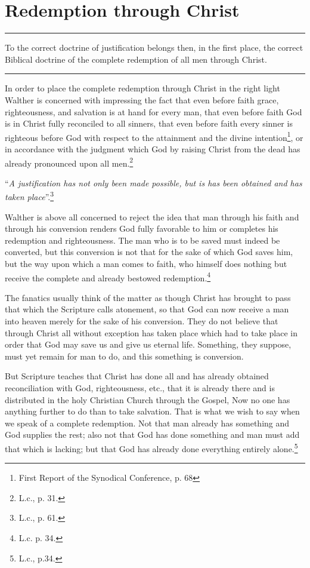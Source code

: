                 \section{Redemption through Christ}
                \hrule
\vspace{.30cm}
To the correct doctrine of justification belongs then, in the first place, the correct Biblical doctrine of the complete redemption of all men through Christ.
\vspace{.01cm}
\hrule
\vspace{1.25cm}
                In order to place the complete redemption through Christ in the right light Walther is concerned with impressing the fact that even before faith grace, righteousness, and salvation is at hand for every man, that even before faith God is in Christ fully reconciled to all sinners, that even before faith every sinner is righteous before God with respect to the attainment and the divine intention\footnote{First Report of the Synodical Conference, p. 68}, or in accordance with the judgment which God by raising Christ from the dead has already pronounced upon all men.\footnote{L.c., p. 31.}  \begin{displayquote}“\textit{A justification has not only been made possible, but is has been obtained and has taken place}”.\footnote{L.c., p. 61.}\end{displayquote}  Walther is above all concerned to reject the idea that man through his faith and through his conversion renders God fully favorable to him or completes his redemption and righteousness.  The man who is to be saved must indeed be converted, but this conversion is not that for the sake of which God saves him, but the way upon which a man comes to faith, who himself does nothing but receive the complete and already bestowed redemption.\footnote{L.c. p. 34.}  \par The fanatics usually think of the matter as though Christ has brought to pass that which the Scripture calls atonement, so that God can now receive a man into heaven merely for the sake of his conversion.  They do not believe that through Christ all without exception has taken place which had to take place in order that God may save us and give us eternal life.  Something, they suppose, must yet remain for man to do, and this something is conversion.\par  But Scripture teaches that Christ has done all and has already obtained reconciliation with God, righteousness, etc., that it is already there and is distributed in the holy Christian Church through the Gospel,  Now no one has anything further to do than to take salvation.  That is what we wish to say when we speak of a complete redemption.  Not that man already has something and God supplies the rest; also not that God has done something and man must add that which is lacking; but that God has already done everything entirely alone.\footnote{L.c., p.34.}

